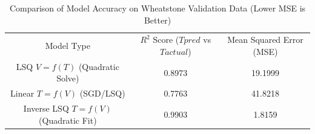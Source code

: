 \begin{table}[H]
\centering
\caption{Comparison of Model Accuracy on Wheatstone Validation Data (Lower MSE is Better)}
\label{table:wheatstone_validation_accuracy_table}
\begin{tabular}{ccc}

                          Model Type & $R^2$ Score ($T {pred}$ vs $T {actual}$) & Mean Squared Error (MSE) \\

      LSQ $V=f(T)$ (Quadratic Solve) &                                   0.8973 &                  19.1999 \\
           Linear $T=f(V)$ (SGD/LSQ) &                                   0.7763 &                  41.8218 \\
Inverse LSQ $T=f(V)$ (Quadratic Fit) &                                   0.9903 &                   1.8159 \\

\end{tabular}
\end{table}
